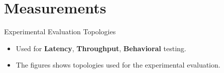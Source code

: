 \documentclass[hyperref={pdfpagelabels=false, unicode},pdf,slideColor,fyma,9pt]{beamer}
\begin{document}
{    \section{Measurements}
    \begin{frame}[noframenumbering]{Experimental Evaluation Topologies}
      \begin{itemize}
          \setlength\itemsep{0.5em}
          \item Used for \textbf{Latency}, \textbf{Throughput}, \textbf{Behavioral} testing.
          \item The figures shows topologies used for the experimental evaluation.
      \end{itemize}
      \begin{figure}[ht]
        \begin{center}

\end{center}
\end{figure}
\end{frame}}
\end{document}
